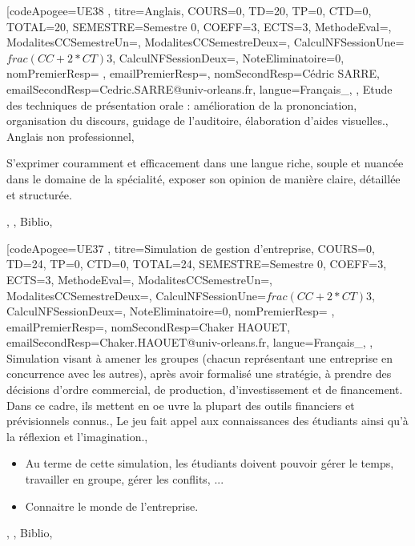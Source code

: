 \vfill


\module[codeApogee={UE38 },
titre={Anglais},
COURS={0},
TD={20},
TP={0},
CTD={0},
TOTAL={20},
SEMESTRE={Semestre 0},
COEFF={3},
ECTS={3},
MethodeEval={},
ModalitesCCSemestreUn={},
ModalitesCCSemestreDeux={},
CalculNFSessionUne={$frac{(CC+2*CT)}{3}$},
CalculNFSessionDeux={},
NoteEliminatoire={0},
nomPremierResp={ },
emailPremierResp={},
nomSecondResp={Cédric SARRE},
emailSecondResp={Cedric.SARRE@univ-orleans.fr},
langue={Français_},
{},
{Etude des techniques de présentation orale : amélioration de la prononciation, organisation du discours, guidage de l'auditoire, élaboration d'aides visuelles.},
{Anglais non professionnel},
{\begin{itemize}
\ObjItem S'exprimer couramment et efficacement dans une langue riche, souple et nuancée dans le domaine de la spécialité, exposer son opinion de manière claire, détaillée et structurée.
\end{itemize}},
{},
{Biblio},

\vfill


\module[codeApogee={UE37 },
titre={Simulation de  gestion d'entreprise},
COURS={0},
TD={24},
TP={0},
CTD={0},
TOTAL={24},
SEMESTRE={Semestre 0},
COEFF={3},
ECTS={3},
MethodeEval={},
ModalitesCCSemestreUn={},
ModalitesCCSemestreDeux={},
CalculNFSessionUne={$frac{(CC+2*CT)}{3}$},
CalculNFSessionDeux={},
NoteEliminatoire={0},
nomPremierResp={ },
emailPremierResp={},
nomSecondResp={Chaker HAOUET},
emailSecondResp={Chaker.HAOUET@univ-orleans.fr},
langue={Français_},
{},
{Simulation visant à amener les groupes (chacun représentant une entreprise en concurrence avec les autres), après avoir formalisé une stratégie, 
à prendre des décisions d'ordre commercial, de production, d'investissement et de financement. Dans ce cadre, ils mettent en oe uvre la 
plupart des outils financiers et prévisionnels connus.},
{Le jeu fait appel aux connaissances des étudiants ainsi qu'à la réflexion et l'imagination.},
{\begin{itemize}
\item Au terme de cette simulation, les étudiants doivent pouvoir gérer le temps, travailler en groupe, gérer les conflits, ... 
  \item Connaitre le monde de l'entreprise.
\end{itemize}},
{},
{Biblio},

\vfill


